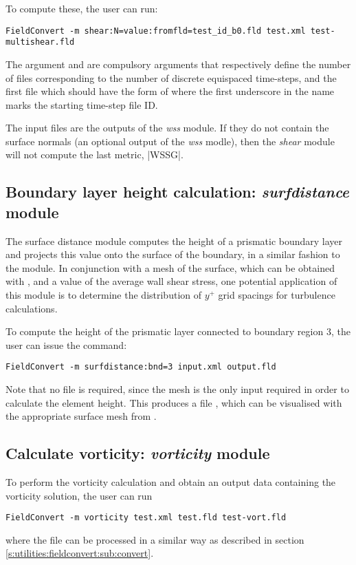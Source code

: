 To compute these, the user can run:
\begin{lstlisting}[style=BashInputStyle] 
FieldConvert -m shear:N=value:fromfld=test_id_b0.fld test.xml test-multishear.fld
\end{lstlisting}
The argument  and  are compulsory arguments that respectively define the number of  files corresponding to the number of discrete equispaced time-steps, and the first  file which should have the form of  where the first underscore in the name marks the starting time-step file ID. 

The input  files are the outputs of the \textit{wss} module. If they do not contain the surface normals (an optional output of the \textit{wss} modle), then the \textit{shear} module will not compute the last metric, |WSSG|. 


%
%
%
\subsection{Boundary layer height calculation: \textit{surfdistance} module}

The surface distance module computes the height of a prismatic boundary layer
and projects this value onto the surface of the boundary, in a similar fashion
to the  module. In conjunction with a mesh of the surface, which
can be obtained with , and a value of the average wall shear
stress, one potential application of this module is to determine the
distribution of $y^+$ grid spacings for turbulence calculations.

To compute the height of the prismatic layer connected to boundary region 3, the
user can issue the command:
\begin{lstlisting}[style=BashInputStyle]
FieldConvert -m surfdistance:bnd=3 input.xml output.fld
\end{lstlisting}
Note that no  file is required, since the mesh is the only input
required in order to calculate the element height. This produces a file
, which can be visualised with the appropriate surface
mesh from .

%
%
%
\subsection{Calculate vorticity: \textit{vorticity} module}
To perform the vorticity calculation and obtain an output 
data containing the vorticity solution, the user can run
\begin{lstlisting}[style=BashInputStyle]
FieldConvert -m vorticity test.xml test.fld test-vort.fld
\end{lstlisting}
where the file  can be processed in a similar 
way as described in section \ref{s:utilities:fieldconvert:sub:convert}.
%
%
%


